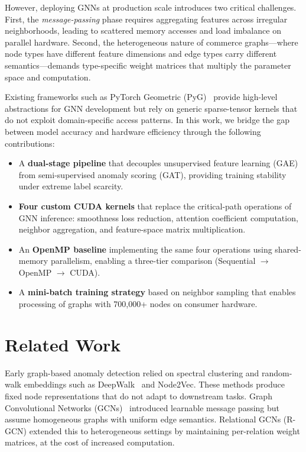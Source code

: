 \documentclass[conference]{IEEEtran}
\begin{document}
However, deploying GNNs at production scale introduces two critical challenges. First, the \textit{message-passing} phase requires aggregating features across irregular neighborhoods, leading to scattered memory accesses and load imbalance on parallel hardware. Second, the heterogeneous nature of commerce graphs---where node types have different feature dimensions and edge types carry different semantics---demands type-specific weight matrices that multiply the parameter space and computation.

Existing frameworks such as PyTorch Geometric (PyG)~\cite{b3} provide high-level abstractions for GNN development but rely on generic sparse-tensor kernels that do not exploit domain-specific access patterns. In this work, we bridge the gap between model accuracy and hardware efficiency through the following contributions:
\begin{itemize}
    \item A \textbf{dual-stage pipeline} that decouples unsupervised feature learning (GAE) from semi-supervised anomaly scoring (GAT), providing training stability under extreme label scarcity.
    \item \textbf{Four custom CUDA kernels} that replace the critical-path operations of GNN inference: smoothness loss reduction, attention coefficient computation, neighbor aggregation, and feature-space matrix multiplication.
    \item An \textbf{OpenMP baseline} implementing the same four operations using shared-memory parallelism, enabling a three-tier comparison (Sequential $\rightarrow$ OpenMP $\rightarrow$ CUDA).
    \item A \textbf{mini-batch training strategy} based on neighbor sampling that enables processing of graphs with 700{,}000+ nodes on consumer hardware.
\end{itemize}

\section{Related Work}
Early graph-based anomaly detection relied on spectral clustering and random-walk embeddings such as DeepWalk~\cite{b4} and Node2Vec. These methods produce fixed node representations that do not adapt to downstream tasks. Graph Convolutional Networks (GCNs)~\cite{b1} introduced learnable message passing but assume homogeneous graphs with uniform edge semantics. Relational GCNs (R-GCN) extended this to heterogeneous settings by maintaining per-relation weight matrices, at the cost of increased computation.
\end{document}
